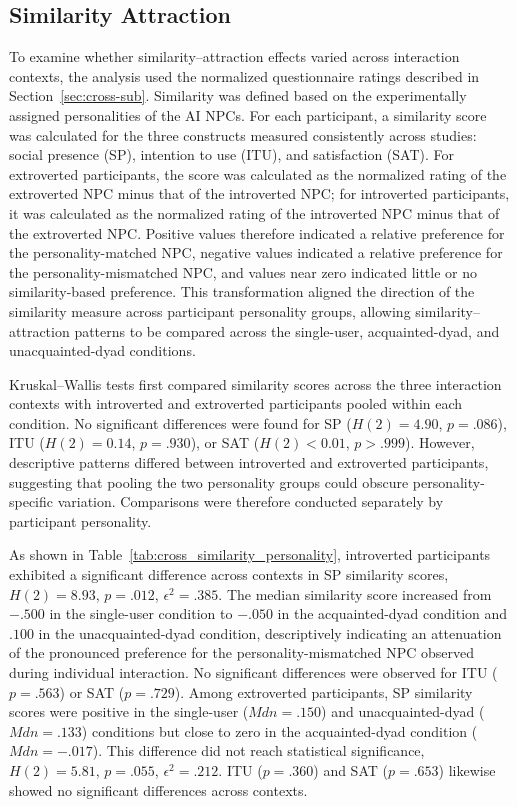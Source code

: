 \documentclass[a4paper,fleqn]{cas-sc}
\begin{document}
\subsection{Similarity Attraction}

To examine whether similarity--attraction effects varied across interaction contexts, the analysis used the normalized questionnaire ratings described in Section~\ref{sec:cross-sub}. Similarity was defined based on the experimentally assigned personalities of the AI NPCs. For each participant, a similarity score was calculated for the three constructs measured consistently across studies: social presence (SP), intention to use (ITU), and satisfaction (SAT). For extroverted participants, the score was calculated as the normalized rating of the extroverted NPC minus that of the introverted NPC; for introverted participants, it was calculated as the normalized rating of the introverted NPC minus that of the extroverted NPC. Positive values therefore indicated a relative preference for the personality-matched NPC, negative values indicated a relative preference for the personality-mismatched NPC, and values near zero indicated little or no similarity-based preference. This transformation aligned the direction of the similarity measure across participant personality groups, allowing similarity--attraction patterns to be compared across the single-user, acquainted-dyad, and unacquainted-dyad conditions.

Kruskal--Wallis tests first compared similarity scores across the three interaction contexts with introverted and extroverted participants pooled within each condition. No significant differences were found for SP ($H(2)=4.90$, $p=.086$), ITU ($H(2)=0.14$, $p=.930$), or SAT ($H(2)<0.01$, $p>.999$). However, descriptive patterns differed between introverted and extroverted participants, suggesting that pooling the two personality groups could obscure personality-specific variation. Comparisons were therefore conducted separately by participant personality.

As shown in Table~\ref{tab:cross_similarity_personality}, introverted participants exhibited a significant difference across contexts in SP similarity scores, $H(2)=8.93$, $p=.012$, $\epsilon^2=.385$. The median similarity score increased from $-.500$ in the single-user condition to $-.050$ in the acquainted-dyad condition and $.100$ in the unacquainted-dyad condition, descriptively indicating an attenuation of the pronounced preference for the personality-mismatched NPC observed during individual interaction. No significant differences were observed for ITU ($p=.563$) or SAT ($p=.729$). Among extroverted participants, SP similarity scores were positive in the single-user ($Mdn=.150$) and unacquainted-dyad ($Mdn=.133$) conditions but close to zero in the acquainted-dyad condition ($Mdn=-.017$). This difference did not reach statistical significance, $H(2)=5.81$, $p=.055$, $\epsilon^2=.212$. ITU ($p=.360$) and SAT ($p=.653$) likewise showed no significant differences across contexts.
\end{document}
